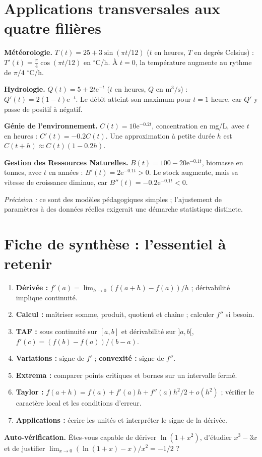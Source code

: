 \documentclass[11pt,a4paper,oneside]{article}
\newcommand{\e}{\mathrm e}
\begin{document}
\section{Applications transversales aux quatre filières}
\begin{applicationbox}
\textbf{Météorologie.} $T(t)=25+3\sin(\pi t/12)$ ($t$ en heures, $T$ en degrés Celsius) : $T'(t)=\frac\pi4\cos(\pi t/12)$ en $^\circ$C/h. À $t=0$, la température augmente au rythme de $\pi/4$ $^\circ$C/h.

\textbf{Hydrologie.} $Q(t)=5+2t\e^{-t}$ ($t$ en heures, $Q$ en $\mathrm{m^3/s}$) : $Q'(t)=2(1-t)\e^{-t}$. Le débit atteint son maximum pour $t=1$ heure, car $Q'$ y passe de positif à négatif.

\textbf{Génie de l'environnement.} $C(t)=10\e^{-0.2t}$, concentration en mg/L, avec $t$ en heures : $C'(t)=-0.2C(t)$. Une approximation à petite durée $h$ est $C(t+h)\approx C(t)(1-0.2h)$.

\textbf{Gestion des Ressources Naturelles.} $B(t)=100-20\e^{-0.1t}$, biomasse en tonnes, avec $t$ en années : $B'(t)=2\e^{-0.1t}>0$. Le stock augmente, mais sa vitesse de croissance diminue, car $B''(t)=-0.2\e^{-0.1t}<0$.
\end{applicationbox}
\textit{Précision :} ce sont des modèles pédagogiques simples ; l'ajustement de paramètres à des données réelles exigerait une démarche statistique distincte.

\section{Fiche de synthèse : l'essentiel à retenir}
\begin{objectifbox}
\begin{enumerate}
\item \textbf{Dérivée :} $f'(a)=\lim_{h\to0}(f(a+h)-f(a))/h$ ; dérivabilité implique continuité.
\item \textbf{Calcul :} maîtriser somme, produit, quotient et chaîne ; calculer $f''$ si besoin.
\item \textbf{TAF :} sous continuité sur $[a,b]$ et dérivabilité sur $]a,b[$, $f'(c)=(f(b)-f(a))/(b-a)$.
\item \textbf{Variations :} signe de $f'$ ; \textbf{convexité :} signe de $f''$.
\item \textbf{Extrema :} comparer points critiques et bornes sur un intervalle fermé.
\item \textbf{Taylor :} $f(a+h)=f(a)+f'(a)h+f''(a)h^2/2+o(h^2)$ ; vérifier le caractère local et les conditions d'erreur.
\item \textbf{Applications :} écrire les unités et interpréter le signe de la dérivée.
\end{enumerate}
\end{objectifbox}
\textbf{Auto-vérification.} Êtes-vous capable de dériver $\ln(1+x^2)$, d'étudier $x^3-3x$ et de justifier $\lim_{x\to0}(\ln(1+x)-x)/x^2=-1/2$ ?
\end{document}

